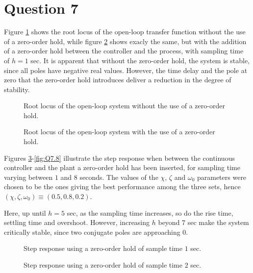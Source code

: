 \section{Question 7}

Figure \ref{fig:Q7.rloc_F_G} shows the root locus of the open-loop transfer
function without the use of a zero-order hold, while figure
\ref{fig:Q7.rloc_F_ZOH_G} shows exacly the same, but with the addition of a
zero-order hold between the controller and the process, with sampling time of
$h=1$ sec. It is apparent that without the zero-order hold, the system is stable,
since all poles have negative real values. However, the time delay and the pole
at zero that the zero-order hold introduces deliver a reduction in the degree of
stability.

\begin{figure}[H]\centering
	\centering
	\scalebox{1}{}
  \caption{Root locus of the open-loop system without the use of a zero-order hold.}
  \label{fig:Q7.rloc_F_G}
\end{figure}

\begin{figure}[H]\centering
	\centering
	\scalebox{1}{}
  \caption{Root locus of the open-loop system with the use of a zero-order hold.}
  \label{fig:Q7.rloc_F_ZOH_G}
\end{figure}

Figures \ref{fig:Q7.1}-\ref{fig:Q7.8} illustrate the step response when between
the continuous controller and the plant a zero-order hold has been inserted, for
sampling time varying between $1$ and $8$ seconds. The values of the $\chi$,
$\zeta$ and $\omega_0$ parameters were chosen to be the ones giving the best
performance among the three sets,
hence $(\chi, \zeta, \omega_0) \equiv (0.5, 0.8, 0.2)$.

Here, up until $h = 5$ sec, as the sampling time increases, so do the rise
time, settling time and overshoot. However, increasing $h$ beyond $7$ sec
make the system critically stable, since two conjugate poles are approaching
$0$.

\begin{figure}[H]\centering
	\centering
	\scalebox{1}{}
  \caption{Step response using a zero-order hold of sample time $1$ sec.}
  \label{fig:Q7.1}
\end{figure}

\begin{figure}[H]\centering
	\centering
	\scalebox{1}{}
  \caption{Step response using a zero-order hold of sample time $2$ sec.}
  \label{fig:Q7.2}
\end{figure}

